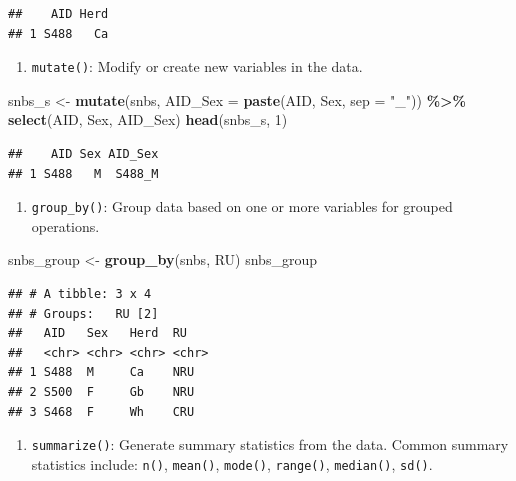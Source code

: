 \documentclass[
]{book}
\newenvironment{Shaded}{\begin{snugshade}}{\end{snugshade}}
\newcommand{\AttributeTok}[1]{\textcolor[rgb]{0.13,0.29,0.53}{#1}}
\newcommand{\DecValTok}[1]{\textcolor[rgb]{0.00,0.00,0.81}{#1}}
\newcommand{\FunctionTok}[1]{\textcolor[rgb]{0.13,0.29,0.53}{\textbf{#1}}}
\newcommand{\NormalTok}[1]{#1}
\newcommand{\OtherTok}[1]{\textcolor[rgb]{0.56,0.35,0.01}{#1}}
\newcommand{\SpecialCharTok}[1]{\textcolor[rgb]{0.81,0.36,0.00}{\textbf{#1}}}
\newcommand{\StringTok}[1]{\textcolor[rgb]{0.31,0.60,0.02}{#1}}
\providecommand{\tightlist}{%
  \setlength{\itemsep}{0pt}\setlength{\parskip}{0pt}}
\begin{document}
\begin{verbatim}
##    AID Herd
## 1 S488   Ca
\end{verbatim}

\begin{enumerate}
\def\labelenumi{\arabic{enumi}.}
\setcounter{enumi}{2}
\tightlist
\item
  \texttt{mutate()}: Modify or create new variables in the data.
\end{enumerate}

\begin{Shaded}
\begin{Highlighting}[]
\NormalTok{snbs\_s }\OtherTok{\textless{}{-}} \FunctionTok{mutate}\NormalTok{(snbs, }\AttributeTok{AID\_Sex =} \FunctionTok{paste}\NormalTok{(AID, Sex, }\AttributeTok{sep =} \StringTok{"\_"}\NormalTok{)) }\SpecialCharTok{\%\textgreater{}\%}
  \FunctionTok{select}\NormalTok{(AID, Sex, AID\_Sex)}
\FunctionTok{head}\NormalTok{(snbs\_s, }\DecValTok{1}\NormalTok{)}
\end{Highlighting}
\end{Shaded}

\begin{verbatim}
##    AID Sex AID_Sex
## 1 S488   M  S488_M
\end{verbatim}

\begin{enumerate}
\def\labelenumi{\arabic{enumi}.}
\setcounter{enumi}{3}
\tightlist
\item
  \texttt{group\_by()}: Group data based on one or more variables for grouped operations.
\end{enumerate}

\begin{Shaded}
\begin{Highlighting}[]
\NormalTok{snbs\_group }\OtherTok{\textless{}{-}} \FunctionTok{group\_by}\NormalTok{(snbs, RU)}
\NormalTok{snbs\_group}
\end{Highlighting}
\end{Shaded}

\begin{verbatim}
## # A tibble: 3 x 4
## # Groups:   RU [2]
##   AID   Sex   Herd  RU   
##   <chr> <chr> <chr> <chr>
## 1 S488  M     Ca    NRU  
## 2 S500  F     Gb    NRU  
## 3 S468  F     Wh    CRU
\end{verbatim}

\begin{enumerate}
\def\labelenumi{\arabic{enumi}.}
\setcounter{enumi}{4}
\tightlist
\item
  \texttt{summarize()}: Generate summary statistics from the data. Common summary statistics include: \texttt{n()}, \texttt{mean()}, \texttt{mode()}, \texttt{range()}, \texttt{median()}, \texttt{sd()}.
\end{enumerate}
\end{document}
